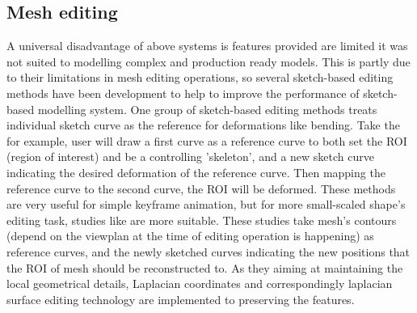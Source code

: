\subsection{Mesh editing}
A universal disadvantage of above systems is features provided are limited it was not suited to modelling complex and production ready models. This is partly due to their limitations in mesh editing operations, so several sketch-based editing methods have been development to help to improve the performance of sketch-based modelling system. One group of sketch-based editing methods \cite{draper2003gestural, kho2005sketching} treats individual sketch curve as the reference for deformations like bending. Take the \cite{kho2005sketching} for example, user will draw a first curve as a reference curve to both set the ROI (region of interest) and be a controlling 'skeleton', and a new sketch curve indicating the desired deformation of the reference curve. Then mapping the reference curve to the second curve, the ROI will be deformed. These methods are very useful for simple keyframe animation, but for more small-scaled shape's editing task, studies like \cite{lipman2004differential,nealen2007sketch,SBM:SBM07:023-030} are more suitable. These studies take mesh's contours (depend on the viewplan at the time of editing operation is happening) as reference curves, and the newly sketched curves indicating the new positions that the ROI of mesh should be reconstructed to. As they aiming at maintaining the local geometrical details, Laplacian coordinates and correspondingly laplacian surface editing technology are implemented to preserving the features. 

